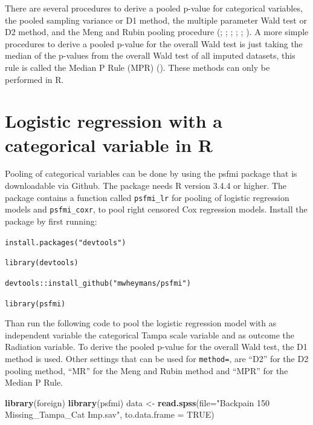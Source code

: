 \documentclass[]{book}
\newenvironment{Shaded}{\begin{snugshade}}{\end{snugshade}}
\newcommand{\KeywordTok}[1]{\textcolor[rgb]{0.13,0.29,0.53}{\textbf{#1}}}
\newcommand{\DataTypeTok}[1]{\textcolor[rgb]{0.13,0.29,0.53}{#1}}
\newcommand{\StringTok}[1]{\textcolor[rgb]{0.31,0.60,0.02}{#1}}
\newcommand{\OtherTok}[1]{\textcolor[rgb]{0.56,0.35,0.01}{#1}}
\newcommand{\NormalTok}[1]{#1}
\begin{document}
There are several procedures to derive a pooled p-value for categorical
variables, the pooled sampling variance or D1 method, the multiple
parameter Wald test or D2 method, and the Meng and Rubin pooling
procedure (\citet{VanBuuren2018}; \citet{enders2010applied};
\citet{Eekhout2017}; \citet{Meng1992}; \citet{Mistler2013};
\citet{Marshall2009MedResMeth}). A more simple procedures to derive a
pooled p-value for the overall Wald test is just taking the median of
the p-values from the overall Wald test of all imputed datasets, this
rule is called the Median P Rule (MPR) (\citet{Eekhout2017}). These
methods can only be performed in R.

\section{Logistic regression with a categorical variable in
R}\label{logistic-regression-with-a-categorical-variable-in-r}

Pooling of categorical variables can be done by using the psfmi package
that is downloadable via Github. The package needs R version 3.4.4 or
higher. The package contains a function called \texttt{psfmi\_lr} for
pooling of logistic regression models and \texttt{psfmi\_coxr}, to pool
right censored Cox regression models. Install the package by first
running:

\texttt{install.packages("devtools")}

\texttt{library(devtools)}

\texttt{devtools::install\_github("mwheymans/psfmi")}

\texttt{library(psfmi)}

Than run the following code to pool the logistic regression model with
as independent variable the categorical Tampa scale variable and as
outcome the Radiation variable. To derive the pooled p-value for the
overall Wald test, the D1 method is used. Other settings that can be
used for \texttt{method=}, are ``D2'' for the D2 pooling method, ``MR''
for the Meng and Rubin method and ``MPR'' for the Median P Rule.

\begin{Shaded}
\begin{Highlighting}[]
\KeywordTok{library}\NormalTok{(foreign)}
\KeywordTok{library}\NormalTok{(psfmi)}
\NormalTok{data <-}\StringTok{ }\KeywordTok{read.spss}\NormalTok{(}\DataTypeTok{file=}\StringTok{"Backpain 150 Missing_Tampa_Cat Imp.sav"}\NormalTok{, }\DataTypeTok{to.data.frame =} \OtherTok{TRUE}\NormalTok{) }
\end{Highlighting}
\end{Shaded}
\end{document}
